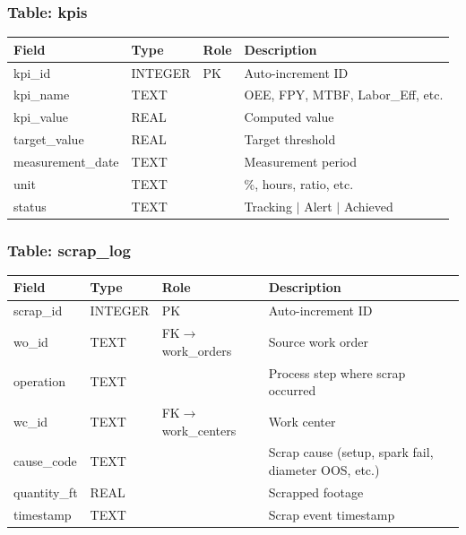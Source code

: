 \documentclass[11pt]{article}
\begin{document}
\subsubsection*{Table: kpis}
\begin{table}[H]\centering\small
\begin{tabular}{@{} l l l L{5.0cm} @{}}
\toprule
\textbf{Field} & \textbf{Type} & \textbf{Role} & \textbf{Description} \\
\midrule
kpi\_id           & INTEGER & PK  & Auto-increment ID \\
kpi\_name         & TEXT    &     & OEE, FPY, MTBF, Labor\_Eff, etc. \\
kpi\_value        & REAL    &     & Computed value \\
target\_value     & REAL    &     & Target threshold \\
measurement\_date & TEXT    &     & Measurement period \\
unit             & TEXT    &     & \%, hours, ratio, etc. \\
status           & TEXT    &     & Tracking $\mid$ Alert $\mid$ Achieved \\
\bottomrule
\end{tabular}
\end{table}

\subsubsection*{Table: scrap\_log}
\begin{table}[H]\centering\small
\begin{tabular}{@{} l l l L{5.5cm} @{}}
\toprule
\textbf{Field} & \textbf{Type} & \textbf{Role} & \textbf{Description} \\
\midrule
scrap\_id    & INTEGER & PK  & Auto-increment ID \\
wo\_id       & TEXT    & FK$\to$work\_orders & Source work order \\
operation    & TEXT    &     & Process step where scrap occurred \\
wc\_id       & TEXT    & FK$\to$work\_centers & Work center \\
cause\_code  & TEXT    &     & Scrap cause (setup, spark fail, diameter OOS, etc.) \\
quantity\_ft & REAL    &     & Scrapped footage \\
timestamp    & TEXT    &     & Scrap event timestamp \\
\bottomrule
\end{tabular}
\end{table}
\end{document}
